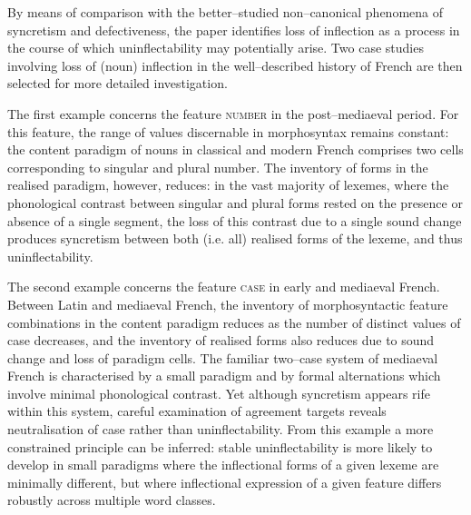 \documentclass[output=paper]{langscibook}
\begin{document}
By means of comparison with the better–studied non–canonical phenomena of syncretism and defectiveness, the paper identifies loss of inflection as a process in the course of which uninflectability may potentially arise. Two case studies involving loss of (noun) inflection in the well–described history of French are then selected for more detailed investigation.

The first example concerns the feature \textsc{number} in the post–mediaeval period. For this feature, the range of values discernable in morphosyntax remains constant: the content paradigm of nouns in classical and modern French comprises two cells corresponding to singular and plural number. The inventory of forms in the realised paradigm, however, reduces: in the vast majority of lexemes, where the phonological contrast between singular and plural forms rested on the presence or absence of a single segment, the loss of this contrast due to a single sound change produces syncretism between both (i.e. all) realised forms of the lexeme, and thus uninflectability. 

The second example concerns the feature \textsc{case} in early and mediaeval French. Between Latin and mediaeval French, the inventory of morphosyntactic feature combinations in the content paradigm reduces as the number of distinct values of case decreases, and the inventory of realised forms also reduces due to sound change and loss of paradigm cells. The familiar two–case system of mediaeval French is characterised by a small paradigm and by formal alternations which involve minimal phonological contrast. Yet although syncretism appears rife within this system, careful examination of agreement targets reveals neutralisation of case rather than uninflectability. From this example a more constrained principle can be inferred: stable uninflectability is more likely to develop in small paradigms where the inflectional forms of a given lexeme are minimally different, but where inflectional expression of a given feature differs robustly across multiple word classes.
\end{document}
